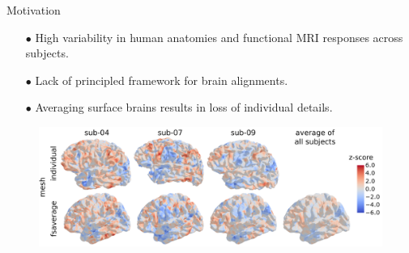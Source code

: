 \documentclass{beamer}
\begin{document}
\begin{frame}{Motivation}
\scriptsize
\begin{itemize}
  \item[$\bullet$] High variability in human anatomies and functional MRI responses across subjects.
  \item[$\bullet$] Lack of principled framework for brain alignments.
  \item[$\bullet$] Averaging surface brains results in loss of individual details.
\end{itemize}
\begin{figure}
  \centering
  \includegraphics[width=1.\linewidth, keepaspectratio=true]{OT_new/intro_variation.pdf}
\end{figure}

\end{frame}
\end{document}
